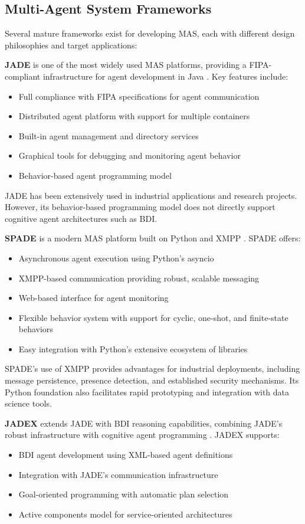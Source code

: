 \subsection{Multi-Agent System Frameworks}
\label{subsec:mas_frameworks}

Several mature frameworks exist for developing \ac{MAS}, each with different design philosophies and target applications:

\textbf{\ac{JADE}} is one of the most widely used \ac{MAS} platforms, providing a FIPA-compliant infrastructure for agent development in Java \cite{2023jade}. Key features include:
\begin{itemize}
    \item Full compliance with \ac{FIPA} specifications for agent communication
    \item Distributed agent platform with support for multiple containers
    \item Built-in agent management and directory services
    \item Graphical tools for debugging and monitoring agent behavior
    \item Behavior-based agent programming model
\end{itemize}
\ac{JADE} has been extensively used in industrial applications and research projects. However, its behavior-based programming model does not directly support cognitive agent architectures such as \ac{BDI}.

\textbf{\ac{SPADE}} is a modern \ac{MAS} platform built on Python and \ac{XMPP} \cite{2023spade}. SPADE offers:
\begin{itemize}
    \item Asynchronous agent execution using Python's asyncio
    \item \ac{XMPP}-based communication providing robust, scalable messaging
    \item Web-based interface for agent monitoring
    \item Flexible behavior system with support for cyclic, one-shot, and finite-state behaviors
    \item Easy integration with Python's extensive ecosystem of libraries
\end{itemize}
\ac{SPADE}'s use of \ac{XMPP} provides advantages for industrial deployments, including message persistence, presence detection, and established security mechanisms. Its Python foundation also facilitates rapid prototyping and integration with data science tools.

\textbf{\ac{JADEX}} extends JADE with \ac{BDI} reasoning capabilities, combining JADE's robust infrastructure with cognitive agent programming \cite{2023jadex}. JADEX supports:
\begin{itemize}
    \item \ac{BDI} agent development using \ac{XML}-based agent definitions
    \item Integration with JADE's communication infrastructure
    \item Goal-oriented programming with automatic plan selection
    \item Active components model for service-oriented architectures
\end{itemize}

